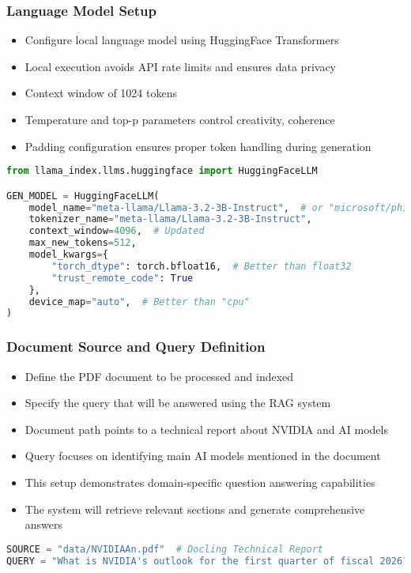 \begin{frame}[fragile]\frametitle{Language Model Setup}
      \begin{itemize}
          \item Configure local language model using HuggingFace Transformers
          \item Local execution avoids API rate limits and ensures data privacy
          \item Context window of 1024 tokens 
          \item Temperature and top-p parameters control creativity, coherence
          \item Padding configuration ensures proper token handling during generation
      \end{itemize}
      
\begin{lstlisting}[language=Python, basicstyle=\tiny]
from llama_index.llms.huggingface import HuggingFaceLLM

GEN_MODEL = HuggingFaceLLM(
    model_name="meta-llama/Llama-3.2-3B-Instruct",  # or "microsoft/phi-3-mini-4k-instruct"
    tokenizer_name="meta-llama/Llama-3.2-3B-Instruct",
    context_window=4096,  # Updated
    max_new_tokens=512,
    model_kwargs={
        "torch_dtype": torch.bfloat16,  # Better than float32
        "trust_remote_code": True
    },
    device_map="auto",  # Better than "cpu"
)
\end{lstlisting}
\end{frame}

\begin{frame}[fragile]\frametitle{Document Source and Query Definition}
      \begin{itemize}
          \item Define the PDF document to be processed and indexed
          \item Specify the query that will be answered using the RAG system
          \item Document path points to a technical report about NVIDIA and AI models
          \item Query focuses on identifying main AI models mentioned in the document
          \item This setup demonstrates domain-specific question answering capabilities
          \item The system will retrieve relevant sections and generate comprehensive answers
      \end{itemize}
      
\begin{lstlisting}[language=Python, basicstyle=\tiny]
SOURCE = "data/NVIDIAAn.pdf"  # Docling Technical Report
QUERY = "What is NVIDIA's outlook for the first quarter of fiscal 2026?"
\end{lstlisting}
\end{frame}

